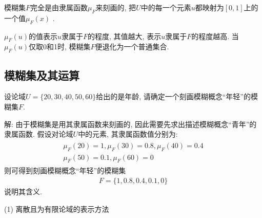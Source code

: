 {%
\begin{remark}
 模糊集$F$完全是由隶属函数$\mu_{F}$来刻画的, 把$U$中的每一个元素$u$都映射为$[0, 1]$上的一个值$\mu_F(x)$ .

 $\mu_F(u)$的值表示$u$隶属于$F$的程度, 其值越大, 表示$u$隶属于$F$的程度越高. 当$\mu_F(u)$仅取0和1时, 模糊集$F$便退化为一个普通集合.
\end{remark}
\subsection{模糊集及其运算}
\begin{example}
  设论域$U=\{20, 30, 40, 50, 60\}$给出的是年龄, 请确定一个刻画模糊概念“年轻”的模糊集$F$.
\end{example}

解: 由于模糊集是用其隶属函数来刻画的, 因此需要先求出描述模糊概念“青年”的隶属函数. 假设对论域$U$中的元素, 其隶属函数值分别为:
\begin{align}
 \begin{array}{l}{\mu_{F}(20)=1, \mu_{F}(30)=0.8, \mu_{F}(40)=0.4} \\ {\mu_{F}(50)=0.1, \mu_{F}(60)=0}\end{array}
\end{align}
则可得到刻画模糊概念“年轻”的模糊集
\begin{align}
  F=\{ 1, 0.8, 0.4, 0.1, 0\}
\end{align}
说明其含义.

(1) 离散且为有限论域的表示方法

}
